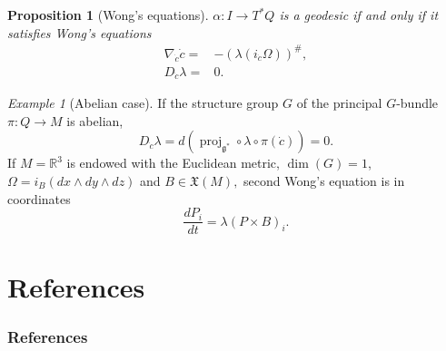 \documentclass [xcolor=svgnames, t] {beamer}
\theoremstyle{definition}
\theoremstyle{plain}
\newtheorem{prop}{Proposition}
\theoremstyle{remark}
\newtheorem{ex}{Example}
\begin{document}
\begin{frame}[allowframebreaks]
\begin{prop}[Wong's equations]
	$ \alpha: I \rightarrow T^*Q $ is a geodesic if and only if it satisfies Wong's equations
	\begin{align}
		\nabla_{\dot{c}}\dot{c} =& -(\lambda(i_{\dot{c}}\Omega))^\#,\\
		D_{\dot{c}}\lambda =& 0.
	\end{align}
\end{prop}
\begin{ex}[Abelian case]
	If the structure group $ G $ of the principal $ G $-bundle $ \pi: Q \rightarrow M $ is abelian,
	$$  D_{\dot{c}}\lambda = d( \operatorname{proj}_{ \mathfrak{g}^*}\circ \lambda\circ\pi(\dot{c}))=0. $$ 
	If $ M = \mathbb{R}^3 $ is endowed with the Euclidean metric, $ \operatorname{dim} (G)=1 $, $ \Omega= i_B(dx\wedge dy\wedge dz) $ and $ B\in \mathfrak{X}(M), $ second Wong's equation is in coordinates 
	$$ \frac{d P_i}{dt} =\lambda (P\times B)_i. $$ 
\end{ex}
\end{frame}

\section{References}
\begin{frame} [allowframebreaks]\frametitle{References}
        
	\nocite{*}
        
\end{frame}
\end{document}
